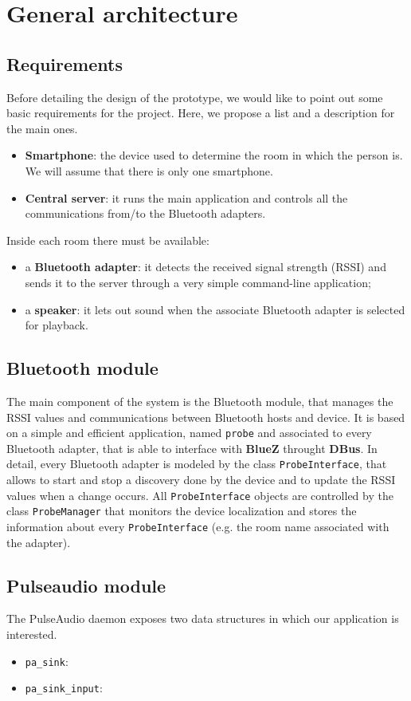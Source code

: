 \documentclass[conference]{IEEEtran}
\begin{document}
\section{General architecture}

\subsection{Requirements}
Before detailing the design of the prototype, we would like to point out some basic requirements for the project. Here, we propose a list and a description for the main ones.
\begin{itemize}
\item{\textbf{Smartphone}:} the device used to determine the room in which the person is. We will assume that there is only one smartphone.
\item{\textbf{Central server}:} it runs the main application and controls all the communications from/to the Bluetooth adapters.
\end{itemize}
Inside each room there must be available:
\begin{itemize}
\item{a \textbf{Bluetooth adapter}:} it detects the received signal strength (RSSI) and sends it to the server through a very simple command-line application;
\item{a \textbf{speaker}:} it lets out sound when the associate Bluetooth adapter is selected for playback.
\end{itemize}


\subsection{Bluetooth module}
The main component of the system is the Bluetooth module, that manages the RSSI values and communications between Bluetooth hosts and device. It is based on a simple and efficient application, named \texttt{probe} and associated to every Bluetooth adapter, that is able to interface with \textbf{BlueZ} throught \textbf{DBus}. In detail, every Bluetooth adapter is modeled by the class \texttt{ProbeInterface}, that allows to start and stop a discovery done by the device and to update the RSSI values when a change occurs. All \texttt{ProbeInterface} objects are controlled by the class \texttt{ProbeManager} that monitors the device localization and stores the information about every \texttt{ProbeInterface} (e.g. the room name associated with the adapter).

\subsection{Pulseaudio module}
The PulseAudio daemon exposes two data structures in which our application is interested.
\begin{itemize}
\item \texttt{pa\_sink}:
\item \texttt{pa\_sink\_input}:
\end{itemize}
\end{document}

